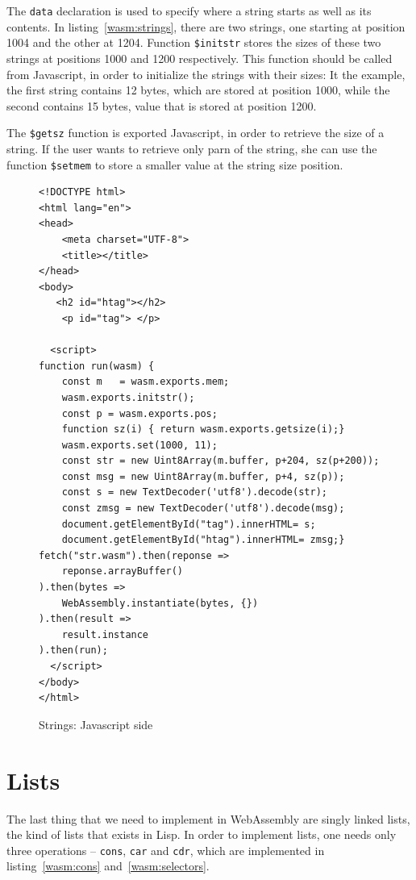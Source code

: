 \documentclass[a4paper,12pt]{book}
\begin{document}
The \verb|data| declaration is used to specify
where a string starts as well as its contents.
In listing~\ref{wasm:strings}, there are two
strings, one starting at position 1004 and the
other at 1204. Function \verb|$initstr| stores
the sizes of these two strings at positions 1000
and 1200 respectively. This function should be
called from Javascript, in order to initialize
the strings with their sizes: It the example,
the first string contains 12 bytes, which are
stored at position 1000, while the second contains
15 bytes, value that is stored at position 1200.

The \verb|$getsz| function is exported Javascript,
in order to retrieve the size of a string. If
the user wants to retrieve only parn of the string,
she can use the function \verb|$setmem| to store
a smaller value at the string size position.

\begin{figure}[!h]
  \begin{verbatim}
<!DOCTYPE html>
<html lang="en">
<head>
    <meta charset="UTF-8">
    <title></title>
</head>
<body>
   <h2 id="htag"></h2>
    <p id="tag"> </p>
  
  <script>
function run(wasm) {
    const m   = wasm.exports.mem;
    wasm.exports.initstr();
    const p = wasm.exports.pos;
    function sz(i) { return wasm.exports.getsize(i);}
    wasm.exports.set(1000, 11);
    const str = new Uint8Array(m.buffer, p+204, sz(p+200));
    const msg = new Uint8Array(m.buffer, p+4, sz(p));
    const s = new TextDecoder('utf8').decode(str);
    const zmsg = new TextDecoder('utf8').decode(msg);
    document.getElementById("tag").innerHTML= s;
    document.getElementById("htag").innerHTML= zmsg;}
fetch("str.wasm").then(reponse =>
    reponse.arrayBuffer()
).then(bytes =>
    WebAssembly.instantiate(bytes, {})
).then(result =>
    result.instance
).then(run);
  </script>
</body>
</html>
  \end{verbatim}
  \caption{Strings: Javascript side}
  \label{javascript:strings}
\end{figure}

\section{Lists}
The last thing that we need to implement in
WebAssembly are singly linked lists, the
kind of lists that exists in Lisp. In order
to implement lists, one needs only three
operations -- \verb|cons|, \verb|car| and \verb|cdr|,
which are implemented in listing~\ref{wasm:cons}
and~\ref{wasm:selectors}.
\end{document}
